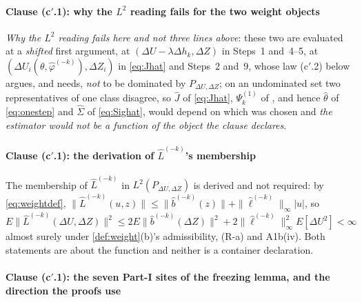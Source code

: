 \paragraph{Clause \textup{(c$'$.1)}: why the $L^{2}$ reading fails for the two weight objects}

\emph{Why the $L^{2}$ reading fails here and not three lines above}: these two are evaluated at a
\emph{shifted} first argument, at $(\Delta U-\lambda\Delta h_k,\Delta Z)$ in  Steps~1
and~4--5, at $(\Delta U_i(\theta,\hat\varphi^{(-k)}),\Delta Z_i)$ in \eqref{eq:Jhat} and
 Steps~2 and~9, whose law \textup{(c$'$.2)} below argues, and needs, \emph{not} to be
dominated by $P_{\Delta U,\Delta Z}$; on an undominated set two representatives of one class disagree, so
$\hat J$ of \eqref{eq:Jhat}, $\Psi^{(1)}_k$ of , and hence $\hat\theta$ of
\eqref{eq:onestep} and $\hat\Sigma$ of \eqref{eq:Sighat}, would depend on which was chosen and
\emph{the estimator would not be a function of the object the clause declares}.

\paragraph{Clause \textup{(c$'$.1)}: the derivation of $\hat L^{(-k)}$'s membership}

The membership of $\hat L^{(-k)}$ in $L^{2}(P_{\Delta U,\Delta Z})$ is derived and not required: by \eqref{eq:weightdef},
$\|\hat L^{(-k)}(u,z)\|\le\|\hat b^{(-k)}(z)\|+\|\hat\ell^{(-k)}\|_\infty|u|$, so
$E\|\hat L^{(-k)}(\Delta U,\Delta Z)\|^{2}\le
2E\|\hat b^{(-k)}(\Delta Z)\|^{2}+2\|\hat\ell^{(-k)}\|^{2}_\infty E[\Delta U^{2}]<\infty$ almost surely
under \cref{def:weight}(b)'s admissibility, (R-a) and A1b(iv). Both statements are about the
function and neither is a container declaration.

\paragraph{Clause \textup{(c$'$.1)}: the seven \textbf{Part-I} sites of the freezing lemma, and the direction the proofs use}

